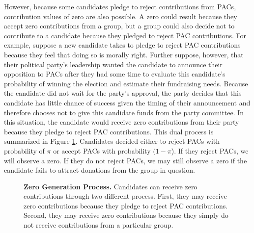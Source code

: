 \documentclass[12pt]{article}
\begin{document}
However, because some candidates pledge to reject contributions from PACs, contribution values of zero are also possible. A zero could result because they accept zero contributions from a group, but a group could also decide not to contribute to a candidate because they pledged to reject PAC contributions. For example, suppose a new candidate takes to pledge to reject PAC contributions because they feel that doing so is morally right. Further suppose, however, that their political party's leadership wanted the candidate to announce their opposition to PACs after they had some time to evaluate this candidate's probability of winning the election and estimate their fundraising needs. Because the candidate did not wait for the party's approval, the party decides that this candidate has little chance of success given the timing of their announcement and therefore chooses not to give this candidate funds from the party committee. In this situation, the candidate would receive zero contributions from their party because they pledge to reject PAC contributions. This dual process is summarized in Figure \ref{fig: zeros}. Candidates decided either to reject PACs with probability of $\pi$ or accept PACs with probability $(1 - \pi$). If they reject PACs, we will observe a zero. If they do not reject PACs, we may still observe a zero if the candidate fails to attract donations from the group in question. 

\begin{figure}[!htb]
    \centering
    \caption{\textbf{Zero Generation Process.} Candidates can receive zero contributions through two different process. First, they may receive zero contributions because they pledge to reject PAC contributions. Second, they may receive zero contributions because they simply do not receive contributions from a particular group.}
    \label{fig: zeros}
\end{figure}
\end{document}
